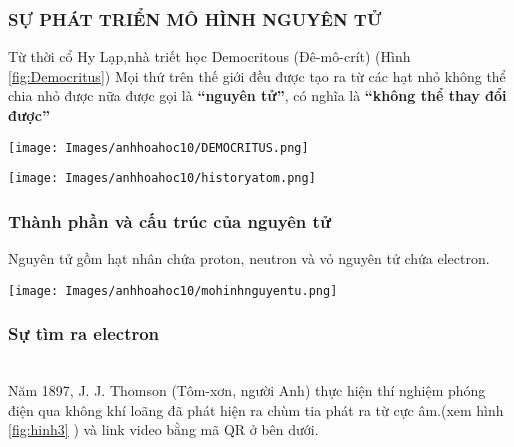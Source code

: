 \subsubsection{SỰ PHÁT TRIỂN MÔ HÌNH NGUYÊN TỬ}
\begin{tomtat}
	\begin{minipage}[htp!]{0.5\textwidth}
		Từ thời cổ Hy Lạp,nhà triết học Democritous (Đê-mô-crít) (Hình \ref{fig:Democritus})
		Mọi thứ trên thế giới đều được tạo ra từ các hạt nhỏ không thể chia nhỏ được nữa được gọi là \textbf{“nguyên tử”}, có nghĩa là \textbf{“không thể thay đổi được”}
	\end{minipage}
	\begin{minipage}[htp!]{0.5\textwidth}
		\begin{center}
			\texttt{[image: Images/anhhoahoc10/DEMOCRITUS.png]}
		\end{center}
	\end{minipage}
	
	\begin{center}
		\texttt{[image: Images/anhhoahoc10/historyatom.png]}
	\end{center}
\end{tomtat}
\subsubsection{Thành phần và cấu trúc của nguyên tử}
\vspace{0.5cm}
\begin{tomtat}
	Nguyên tử gồm hạt nhân chứa proton, neutron và vỏ nguyên tử chứa electron.
	\begin{center}
		\texttt{[image: Images/anhhoahoc10/mohinhnguyentu.png]}
	\end{center}
\end{tomtat}
\subsubsection{Sự tìm ra electron}
\\
Năm 1897, J. J. Thomson (Tôm-xơn, người Anh) thực hiện thí nghiệm phóng điện qua không khí loãng đã phát hiện ra chùm tia phát ra từ cực âm.(xem hình \ref{fig:hinh3} ) và link video bằng mã QR ở bên dưới.\\ 


